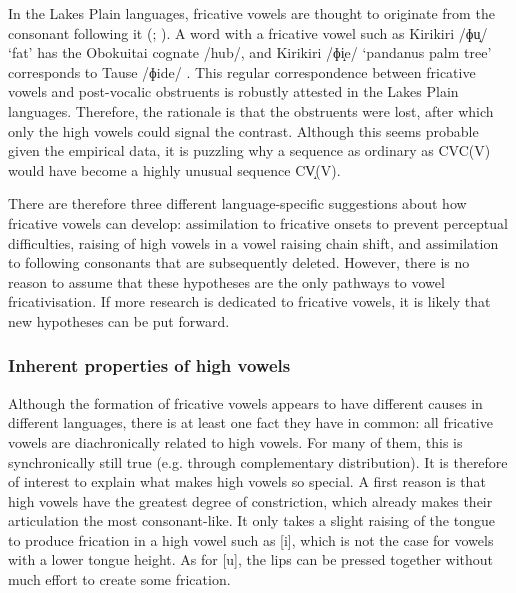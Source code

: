 \documentclass[output=paper,colorlinks,citecolor=brown,chinesefont]{langscibook}
\begin{document}
In the Lakes Plain languages, fricative vowels are thought to originate from the consonant following it (\cite{clouse&clouse_1993}; \cite[56]{Yoder_2020}). A word with a fricative vowel such as Kirikiri /ɸu̝/ `fat' has the Obokuitai cognate /hub/, and Kirikiri /ɸi̝e/ `pandanus palm tree' corresponds to Tause /ɸide/ \citep[14]{clouse&clouse_1993}. This regular correspondence between fricative vowels and post-vocalic obstruents is robustly attested in the Lakes Plain languages. Therefore, the rationale is that the obstruents were lost, after which only the high vowels could signal the contrast. Although this seems probable given the empirical data, it is puzzling why a sequence as ordinary as CVC(V) would have become a highly unusual sequence CV̝(V).

There are therefore three different language-specific suggestions about how fricative vowels can develop: assimilation to fricative onsets to prevent perceptual difficulties, raising of high vowels in a vowel raising chain shift, and assimilation to following consonants that are subsequently deleted. However, there is no reason to assume that these hypotheses are the only pathways to vowel fricativisation. If more research is dedicated to fricative vowels, it is likely that new hypotheses can be put forward.

\subsubsection{Inherent properties of high vowels}
Although the formation of fricative vowels appears to have different causes in different languages, there is at least one fact they have in common: all fricative vowels are diachronically related to high vowels. For many of them, this is synchronically still true (e.g. through complementary distribution). It is therefore of interest to explain what makes high vowels so special. A first reason is that high vowels have the greatest degree of constriction, which already makes their articulation the most consonant-like. It only takes a slight raising of the tongue to produce frication in a high vowel such as [i], which is not the case for vowels with a lower tongue height. As for [u], the lips can be pressed together without much effort to create some frication.
\end{document}
